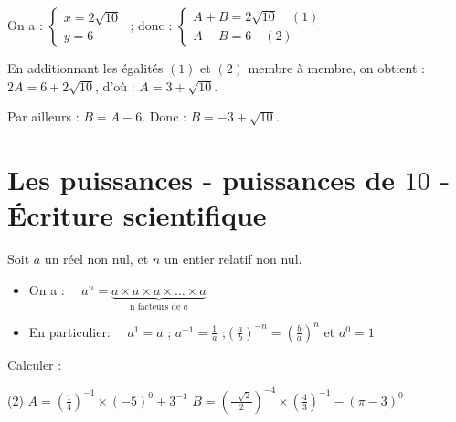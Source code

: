 \documentclass[10pt, a4paper]{article}
\begin{document}
\begin{Solution}[APPLICATION][6]
\begin{enumerate}
On a : $\begin{cases} x = 2\sqrt{10} \\ y = 6 \end{cases}$ ; donc : $\begin{cases} A + B = 2\sqrt{10} \quad (1) \\ A - B = 6 \quad (2) \end{cases}$

\smallskip
En additionnant les égalités $(1)$ et $(2)$ membre à membre, on obtient : $2A = 6 + 2\sqrt{10}$, d'où : $A = 3 + \sqrt{10}$.

\smallskip
Par ailleurs : $B = A - 6$. Donc : $B = -3 + \sqrt{10}$.

\end{enumerate}
\end{Solution}


\section{Les puissances - puissances de $10$ - Écriture scientifique }


\begin{Definition}[]
Soit $a$ un réel non nul, et $n$ un entier relatif non nul.
\begin{itemize}
\item On a :~~
    $a^n = \underbrace{a \times a \times a \times \dots \times a}_{\text{n facteurs de } a}$

    \item En particulier:~~ $a^1 = a$ \quad ; \quad $a^{-1} = \frac{1}{a}$ \quad;\quad $\left(\frac{a}{b}\right)^{-n} = \left(\frac{b}{a}\right)^n$ \quad et \quad $a^0 = 1$
\end{itemize}
\end{Definition}


\begin{Application}[][10 min]
 Calculer :
\begin{tasks}[label=$\bullet$, label-width=5pt, item-indent=15pt](2)
\task $A = \left(\frac{1}{4}\right)^{-1} \times (-5)^0 + 3^{-1}$
\task $B = \left(\frac{-\sqrt{2}}{2}\right)^{-4} \times \left(\frac{4}{3}\right)^{-1} - (\pi - 3)^0$
\end{tasks}
\end{Application}
\end{document}
